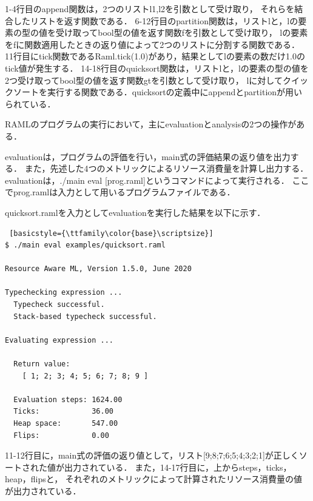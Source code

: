 \documentclass{kuisthesis}
\begin{document}
1-4行目のappend関数は，2つのリストl1,l2を引数として受け取り，
それらを結合したリストを返す関数である．
6-12行目のpartition関数は，リストlと，lの要素の型の値を受け取ってbool型の値を返す関数fを引数として受け取り，
lの要素をfに関数適用したときの返り値によって2つのリストに分割する関数である．
11行目にtick関数であるRaml.tick(1.0)があり，結果としてlの要素の数だけ1.0のtick値が発生する．
14-18行目のquicksort関数は，リストlと，lの要素の型の値を2つ受け取ってbool型の値を返す関数gtを引数として受け取り，
lに対してクイックソートを実行する関数である．quicksortの定義中にappendとpartitionが用いられている．

RAMLのプログラムの実行において，主にevaluationとanalysisの2つの操作がある．

evaluationは，プログラムの評価を行い，main式の評価結果の返り値を出力する．
また，先述した4つのメトリックによるリソース消費量を計算し出力する．
evaluationは，./main eval [prog.raml]というコマンドによって実行される．
ここでprog.ramlは入力として用いるプログラムファイルである．

quicksort.ramlを入力としてevaluationを実行した結果を以下に示す．

\begin{lstlisting} [basicstyle={\ttfamily\color{base}\scriptsize}]
$ ./main eval examples/quicksort.raml

Resource Aware ML, Version 1.5.0, June 2020

Typechecking expression ...
  Typecheck successful.
  Stack-based typecheck successful.

Evaluating expression ...

  Return value:
    [ 1; 2; 3; 4; 5; 6; 7; 8; 9 ]

  Evaluation steps: 1624.00
  Ticks:            36.00
  Heap space:       547.00
  Flips:            0.00

\end{lstlisting}

11-12行目に，main式の評価の返り値として，リスト[9;8;7;6;5;4;3;2;1]が正しくソートされた値が出力されている．
また，14-17行目に，上からsteps，ticks，heap，flipsと，
それぞれのメトリックによって計算されたリソース消費量の値が出力されている．
\end{document}
